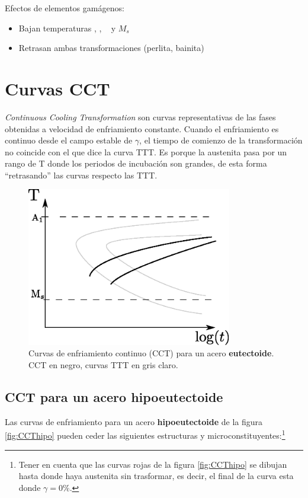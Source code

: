 Efectos de elementos gamágenos:
\begin{itemize}
    \item Bajan temperaturas \Aone, \Athree, \Bs~ y $M_s$
    \item Retrasan ambas transformaciones (perlita, bainita)
\end{itemize}

\section{Curvas CCT}
\textit{Continuous Cooling Transformation} son curvas representativas de las fases obtenidas a velocidad de enfriamiento constante. Cuando el enfriamiento es continuo desde el campo estable de $\gamma$, el tiempo de comienzo de la transformación no coincide con el que dice la curva TTT. Es porque la austenita pasa por un rango de T donde los periodos de incubación son grandes, de esta forma ``retrasando'' las curvas respecto las TTT.

\begin{figure}[htb!]
    \centering
    \includegraphics[width=0.8\textwidth]{fig/CCTeutect.eps}
    \caption{Curvas de enfriamiento continuo (CCT) para un acero \textbf{eutectoide}. CCT en negro, curvas TTT en gris claro.}
    \label{fig:CCTeutect}
\end{figure}

\subsection{CCT para un acero hipoeutectoide}
Las curvas de enfriamiento para un acero \textbf{hipoeutectoide} de la figura \ref{fig:CCThipo} pueden ceder las siguientes estructuras y microconstituyentes:\footnote{Tener en cuenta que las curvas rojas de la figura \ref{fig:CCThipo} se dibujan hasta donde haya austenita sin trasformar, es decir, el final de la curva esta donde $\gamma=0\%$.}


